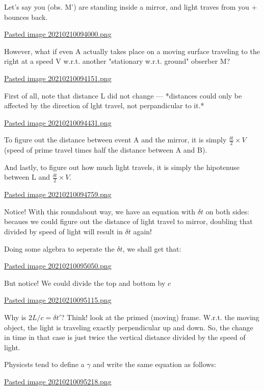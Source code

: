 \documentclass[letterpaper]{article}
\begin{document}
Let's say you (obs. M') are standing inside a mirror, and light traves
from you + bounces back.

\href{Pasted image 20210210094000.png.org}{Pasted image
20210210094000.png}

However, what if even A actually takes place on a moving surface
traveling to the right at a speed V w.r.t. another "stationary w.r.t.
ground" obserber M?

\href{Pasted image 20210210094151.png.org}{Pasted image
20210210094151.png}

First of all, note that distance L did not change --- *distances could
only be affected by the direction of lght travel, not perpandicular to
it.*

\href{Pasted image 20210210094431.png.org}{Pasted image
20210210094431.png}

To figure out the distance between event A and the mirror, it is simply
\(\frac{\delta t}{2} \times V\) (speed of prime travel times half the
distance between A and B).

And lastly, to figure out how much light travels, it is simply the
hipotenuse between L and \(\frac{\delta t}{2} \times V\).

\href{Pasted image 20210210094759.png.org}{Pasted image
20210210094759.png}

Notice! With this roundabout way, we have an equation with \(\delta t\)
on both sides: becaues we could figure out the distance of light travel
to mirror, doubling that divided by speed of light will result in
\(\delta t\) again!

Doing some algebra to seperate the \(\delta t\), we shall get that:

\href{Pasted image 20210210095050.png.org}{Pasted image
20210210095050.png}

But notice! We could divide the top and bottom by \(c\)

\href{Pasted image 20210210095115.png.org}{Pasted image
20210210095115.png}

Why is \(2L/c = \delta t'\)? Think! look at the primed (moving) frame.
W.r.t. the moving object, the light is traveling exactly perpendicular
up and down. So, the change in time in that case is just twice the
vertical distance divided by the speed of light.

Physicsts tend to define a \(\gamma\) and write the same equation as
follows:

\href{Pasted image 20210210095218.png.org}{Pasted image
20210210095218.png}
\end{document}

